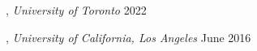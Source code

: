 
, \textit{University of Toronto}	\hfill 2022

, \textit{University of California, Los Angeles} \hfill	June 2016




